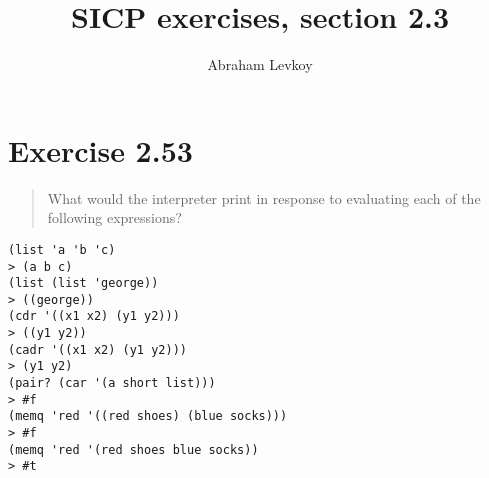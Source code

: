 \documentclass{article}
\author{Abraham Levkoy}
\title{SICP exercises, section 2.3}
\begin{document}
\maketitle

\section{Exercise 2.53}
\begin{quote}
    What would the interpreter print in response to evaluating each of the
    following expressions?
\end{quote}

\begin{lstlisting}
(list 'a 'b 'c)
> (a b c)
(list (list 'george))
> ((george))
(cdr '((x1 x2) (y1 y2)))
> ((y1 y2))
(cadr '((x1 x2) (y1 y2)))
> (y1 y2)
(pair? (car '(a short list)))
> #f
(memq 'red '((red shoes) (blue socks)))
> #f
(memq 'red '(red shoes blue socks))
> #t
\end{lstlisting}
\end{document}
